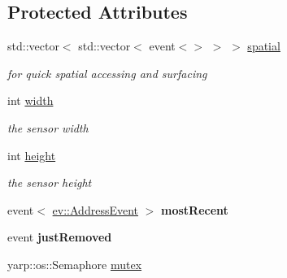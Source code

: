 \subsection*{Protected Attributes}
\begin{DoxyCompactItemize}
\item 
std\+::vector$<$ std\+::vector$<$ event$<$$>$ $>$ $>$ \hyperlink{classev_1_1vSurface_ae75428cabd7e9eabc544d4ef7290e9e7}{spatial}\hypertarget{classev_1_1vSurface_ae75428cabd7e9eabc544d4ef7290e9e7}{}\label{classev_1_1vSurface_ae75428cabd7e9eabc544d4ef7290e9e7}

\begin{DoxyCompactList}\small\item\em for quick spatial accessing and surfacing \end{DoxyCompactList}\item 
int \hyperlink{classev_1_1vSurface_a9666b7ae2580bf5647f65306f911825e}{width}\hypertarget{classev_1_1vSurface_a9666b7ae2580bf5647f65306f911825e}{}\label{classev_1_1vSurface_a9666b7ae2580bf5647f65306f911825e}

\begin{DoxyCompactList}\small\item\em the sensor width \end{DoxyCompactList}\item 
int \hyperlink{classev_1_1vSurface_ab3cf3df2f4fcb7eb5d89e0c5d1a5eeff}{height}\hypertarget{classev_1_1vSurface_ab3cf3df2f4fcb7eb5d89e0c5d1a5eeff}{}\label{classev_1_1vSurface_ab3cf3df2f4fcb7eb5d89e0c5d1a5eeff}

\begin{DoxyCompactList}\small\item\em the sensor height \end{DoxyCompactList}\item 
event$<$ \hyperlink{classev_1_1AddressEvent}{ev\+::\+Address\+Event} $>$ {\bfseries most\+Recent}\hypertarget{classev_1_1vSurface_aaef125f5536a04adeeae2865bd30a888}{}\label{classev_1_1vSurface_aaef125f5536a04adeeae2865bd30a888}

\item 
event {\bfseries just\+Removed}\hypertarget{classev_1_1vSurface_af6a615e0dc468eea2f9803b260610fcf}{}\label{classev_1_1vSurface_af6a615e0dc468eea2f9803b260610fcf}

\item 
yarp\+::os\+::\+Semaphore \hyperlink{classev_1_1vSurface_a34a27a6f5757660da2410b0d6cacbf6d}{mutex}\hypertarget{classev_1_1vSurface_a34a27a6f5757660da2410b0d6cacbf6d}{}\label{classev_1_1vSurface_a34a27a6f5757660da2410b0d6cacbf6d}


\end{DoxyCompactItemize}
